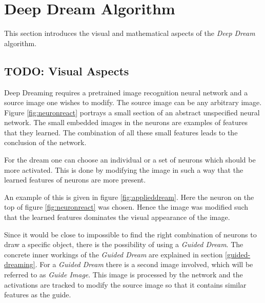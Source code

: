 

\section{Deep Dream Algorithm}
\label{sec:how}

This section introduces the visual and mathematical aspects of the \emph{Deep Dream} algorithm.

\subsection{TODO: Visual Aspects}
\label{sec:visual-aspects}
Deep Dreaming requires a pretrained image recognition neural network and a source image one wishes to modify.
The source image can be any arbitrary image.
Figure \ref{fig:neuronreact} portrays a small section of an abstract unspecified neural network.
The small embedded images in the neurons are examples of features that they learned.
The combination of all these small features leads to the conclusion of the network.

For the dream one can choose an individual or a set of neurons which should be more activated.
This is done by modifying the image in such a way that the learned features of  neurons are more present.

An example of this is given in figure \ref{fig:applieddream}.
Here the neuron on the top of figure \ref{fig:neuronreact} was chosen.
Hence the image was modified such that the learned features dominates the visual appearance of the image.

Since it would be close to impossible to find the right combination of neurons to draw a specific object, there is the possibility of using a \textit{Guided Dream}.
The concrete inner workings of the \textit{Guided Dream} are explained in section \ref{guided-dreaming}.
For a \textit{Guided Dream} there is a second image involved, which will be referred to as \textit{Guide Image}.
This image is processed by the network and the activations are tracked to modify the source image so that it contains similar features as the guide.

